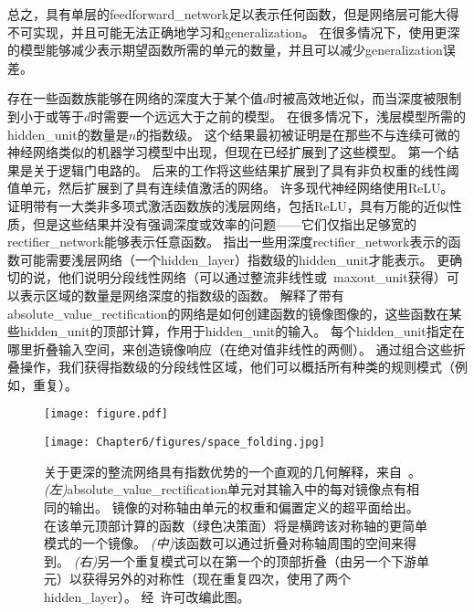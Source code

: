 总之，具有单层的\gls{feedforward_network}足以表示任何函数，但是网络层可能大得不可实现，并且可能无法正确地学习和\gls{generalization}。
在很多情况下，使用更深的模型能够减少表示期望函数所需的单元的数量，并且可以减少\gls{generalization}误差。


存在一些函数族能够在网络的深度大于某个值$d$时被高效地近似，而当深度被限制到小于或等于$d$时需要一个远远大于之前的模型。
在很多情况下，浅层模型所需的\gls{hidden_unit}的数量是$n$的指数级。
这个结果最初被证明是在那些不与连续可微的神经网络类似的机器学习模型中出现，但现在已经扩展到了这些模型。
第一个结果是关于逻辑门电路的\citep{Hastad86}。
后来的工作将这些结果扩展到了具有非负权重的线性阈值单元\citep{Hastad91,Hajnal-et-al-1993}，然后扩展到了具有连续值激活的网络\citep{Maass-1992,Maass-et-al-1994}。
许多现代神经网络使用\gls{ReLU}。
\cite{Leshno-et-al-1993}证明带有一大类非多项式激活函数族的浅层网络，包括\gls{ReLU}，具有万能的近似性质，但是这些结果并没有强调深度或效率的问题——它们仅指出足够宽的\gls{rectifier_network}能够表示任意函数。
\cite{Montufar-et-al-NIPS2014}指出一些用深度\gls{rectifier_network}表示的函数可能需要浅层网络（一个\gls{hidden_layer}）指数级的\gls{hidden_unit}才能表示。
更确切的说，他们说明分段线性网络（可以通过整流非线性或~\gls{maxout_unit}获得）可以表示区域的数量是网络深度的指数级的函数。%
解释了带有\gls{absolute_value_rectification}的网络是如何创建函数的镜像图像的，这些函数在某些\gls{hidden_unit}的顶部计算，作用于\gls{hidden_unit}的输入。
每个\gls{hidden_unit}指定在哪里折叠输入空间，来创造镜像响应（在绝对值非线性的两侧）。
通过组合这些折叠操作，我们获得指数级的分段线性区域，他们可以概括所有种类的规则模式（例如，重复）。
\begin{figure}[!htb]
\ifOpenSource
\centerline{\texttt{[image: figure.pdf]}}
\else
\centerline{\texttt{[image: Chapter6/figures/space\_folding.jpg]}}
\fi
\caption{ %
关于更深的整流网络具有指数优势的一个直观的几何解释，来自~\cite{Montufar-et-al-NIPS2014}。 
\emph{(左)}\gls{absolute_value_rectification}单元对其输入中的每对镜像点有相同的输出。
镜像的对称轴由单元的权重和偏置定义的超平面给出。 在该单元顶部计算的函数（绿色决策面）将是横跨该对称轴的更简单模式的一个镜像。 
\emph{(中)}该函数可以通过折叠对称轴周围的空间来得到。
\emph{(右)}另一个重复模式可以在第一个的顶部折叠（由另一个下游单元）以获得另外的对称性（现在重复四次，使用了两个\gls{hidden_layer}）。 
经~\cite{Montufar-et-al-NIPS2014}许可改编此图。}
\label{fig:chap6_space_folding}
\end{figure}


